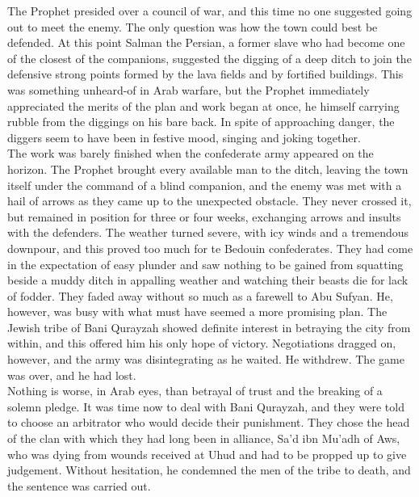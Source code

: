 \documentclass[10pt, twoside,openright]{book}
\begin{document}
The Prophet presided over a council of war, and this time no one suggested going out to meet the 
enemy. The only question was how the town could best be defended. At this point Salman the Persian, a 
former slave who had become one of the closest of the companions, suggested the digging of a deep 
ditch to join the defensive strong points formed by the lava fields and by fortified buildings. This 
was something unheard\hyp{}of in Arab warfare, but the Prophet immediately appreciated the merits of the 
plan and work began at once, he himself carrying rubble from the diggings on his bare back. In spite 
of approaching danger, the diggers seem to have been in festive mood, singing and joking together. \\

The work was barely finished when the confederate army appeared on the horizon. The Prophet brought 
every available man to the ditch, leaving the town itself under the command of a blind companion, and 
the enemy was met with a hail of arrows as they came up to the unexpected obstacle. They never 
crossed it, but remained in position for three or four weeks, exchanging arrows and insults with the 
defenders. The weather turned severe, with icy winds and a tremendous downpour, and this proved too 
much for te Bedouin confederates. They had come in the expectation of easy plunder and saw nothing to 
be gained from squatting beside a muddy ditch in appalling weather and watching their beasts die for 
lack of fodder. They faded away without so much as a farewell to Abu Sufyan. He, however, was busy 
with what must have seemed a more promising plan. The Jewish tribe of Bani Qurayzah showed definite 
interest in betraying the city from within, and this offered him his only hope of victory. 
Negotiations dragged on, however, and the army was disintegrating as he waited. He withdrew. The game 
was over, and he had lost. \\

Nothing is worse, in Arab eyes, than betrayal of trust and the breaking of a solemn pledge. It was 
time now to deal with Bani Qurayzah, and they were told to choose an arbitrator who would decide 
their punishment. They chose the head of the clan with which they had long been in alliance, Sa'd ibn 
Mu'adh of Aws, who was dying from wounds received at Uhud and had to be propped up to give judgement. 
Without hesitation, he condemned the men of the tribe to death, and the sentence was carried out. \\
\end{document}
